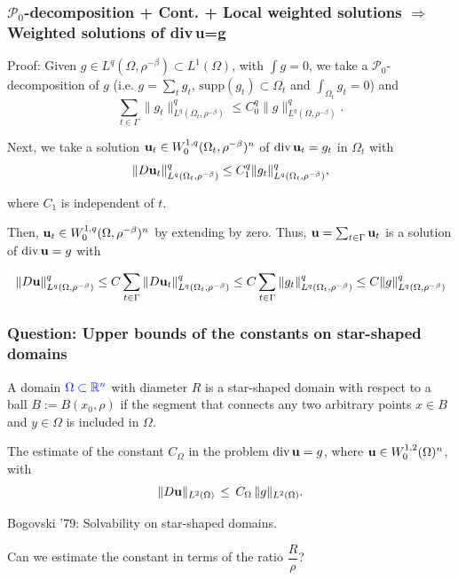 \documentclass[small,xcolor=svgnames]{beamer}
\def\bs{\bigskip}
\def\di{\mbox{\rm div\,}}
\def\O{\Omega}
\def\R{{\mathbb R}}
\def\uu{{\bf u}}
\def\P{\mathcal{P}}
\def\c{\color{blue}}
\begin{document}
        
  



\begin{frame}\frametitle{$\P_0$-decomposition + Cont. + Local weighted solutions $\Rightarrow$ \\ Weighted solutions of \di\uu=g}

{\c Proof:} Given $g\in L^q(\Omega,\rho^{-\beta})\subset L^1(\O)$, with $\int g=0$, we take a $\P_0$-decomposition of $g$ 
(i.e. $g=\sum_t g_t$, $\text{supp}(g_t)\subset \O_t$ and $\int_{\O_t}g_t=0$) and 
\[\sum_{t\in\Gamma}\|g_t\|^q_{L^q(\O_t,\rho^{-\beta})} \leq C_0^q \|g\|^q_{L^q(\O,\rho^{-\beta})}.\]

\bigskip

Next, we take a solution $\uu_t\in W_0^{1,q}(\O_t,\rho^{-\beta})^n$ of $\di\uu_t=g_t$ in $\O_t$ with 
\[\|D\uu_t\|^q_{L^q(\O_t,\rho^{-\beta})} \leq C^q_1 \|g_t\|^q_{L^q(\O_t,\rho^{-\beta})},\]

where $C_1$ is independent of $t$. 

Then, $\uu_t\in W_0^{1,q}(\O,\rho^{-\beta})^n$ by extending by zero. Thus, $\uu=\sum_{t\in\Gamma} \uu_t$ is a solution of $\di\uu=g$ with 


\[\|D\uu\|^q_{L^q(\O,\rho^{-\beta})}\leq C\sum_{t\in\Gamma}\|D\uu_t\|^q_{L^q(\O_t,\rho^{-\beta})} \leq C\sum_{t\in\Gamma}\|g_t\|^q_{L^q(\O_t,\rho^{-\beta})} \leq C \|g\|^q_{L^q(\O,\rho^{-\beta})}\]

\end{frame}

  

\begin{frame}\frametitle{Question: Upper bounds of the constants on star-shaped domains}

A domain ${\c\O\subset \R^n}$ with diameter {\c $R$} is a star-shaped domain with respect to a ball {\c $B:=B(x_0,\rho)$} if the segment that connects any two arbitrary points $x\in B$ and $y\in \O$ is included in $\O$.

\bs

The estimate of the constant $C_\O$ in the problem $\di\uu=g$, where $\uu\in W^{1,2}_0(\O)^n$, with \[\|D\uu\|_{L^2(\O)}\,\leq\,C_\O\,\|g\|_{L^2(\O)}.\]

\bs

Bogovski '79: Solvability on star-shaped domains. 

\bs 

{\c Can we estimate the constant in terms of the ratio $\dfrac{R}{\rho}$?}

\end{frame}
\end{document}
